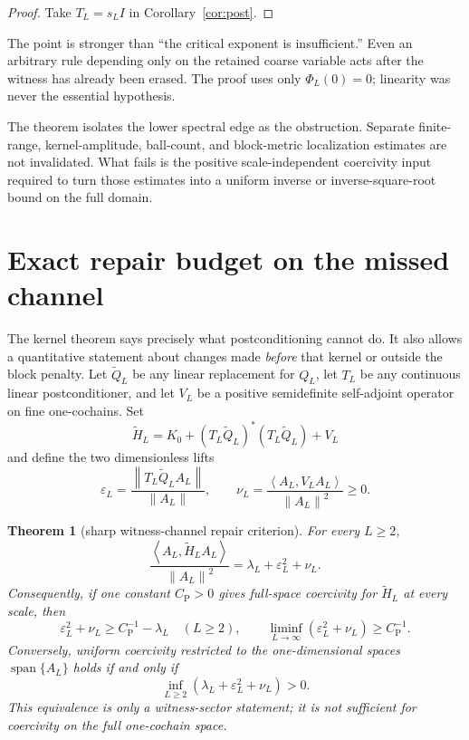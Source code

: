 \documentclass[11pt]{article}
\newtheorem{theorem}{Theorem}[section]
\theoremstyle{definition}
\newcommand{\CP}{C_{\mathrm P}}
\newcommand{\ip}[2]{\left\langle #1,#2\right\rangle}
\newcommand{\norm}[1]{\left\lVert #1\right\rVert}
\begin{document}
\begin{proof}
Take $T_L=s_LI$ in Corollary~\ref{cor:post}.
\end{proof}

The point is stronger than ``the critical exponent is insufficient.''  Even
an arbitrary rule depending only on the retained coarse variable acts after
the witness has already been erased.  The proof uses only $\Phi_L(0)=0$;
linearity was never the essential hypothesis.

The theorem isolates the lower spectral edge as the obstruction.  Separate
finite-range, kernel-amplitude, ball-count, and block-metric localization
estimates are not invalidated.  What fails is the positive scale-independent
coercivity input required to turn those estimates into a uniform inverse or
inverse-square-root bound on the full domain.

\section{Exact repair budget on the missed channel}

The kernel theorem says precisely what postconditioning cannot do.  It also
allows a quantitative statement about changes made \emph{before} that kernel
or outside the block penalty.  Let $\widetilde Q_L$ be any linear replacement
for $Q_L$, let $T_L$ be any continuous linear postconditioner, and let $V_L$
be a positive semidefinite self-adjoint operator on fine one-cochains.  Set
\begin{equation}\label{eq:repaired-H}
 \widetilde H_L=K_0+(T_L\widetilde Q_L)^*(T_L\widetilde Q_L)+V_L
\end{equation}
and define the two dimensionless lifts
\begin{equation}\label{eq:lifts}
 \varepsilon_L=
 \frac{\norm{T_L\widetilde Q_LA_L}}{\norm{A_L}},
 \qquad
 \nu_L=\frac{\ip{A_L}{V_LA_L}}{\norm{A_L}^2}\ge0.
\end{equation}

\begin{theorem}[sharp witness-channel repair criterion]\label{thm:repair}
For every $L\ge2$,
\begin{equation}\label{eq:repair-identity}
 \frac{\ip{A_L}{\widetilde H_LA_L}}{\norm{A_L}^2}
 =\lambda_L+\varepsilon_L^2+\nu_L.
\end{equation}
Consequently, if one constant $\CP>0$ gives full-space coercivity for
$\widetilde H_L$ at every scale, then
\begin{equation}\label{eq:repair-necessary}
 \varepsilon_L^2+\nu_L\ge \CP^{-1}-\lambda_L
 \quad(L\ge2),
 \qquad
 \liminf_{L\to\infty}(\varepsilon_L^2+\nu_L)\ge\CP^{-1}.
\end{equation}
Conversely, uniform coercivity restricted to the one-dimensional spaces
$\operatorname{span}\{A_L\}$ holds if and only if
\begin{equation}\label{eq:repair-iff}
 \inf_{L\ge2}(\lambda_L+\varepsilon_L^2+\nu_L)>0.
\end{equation}
This equivalence is only a witness-sector statement; it is not sufficient for
coercivity on the full one-cochain space.
\end{theorem}
\end{document}
